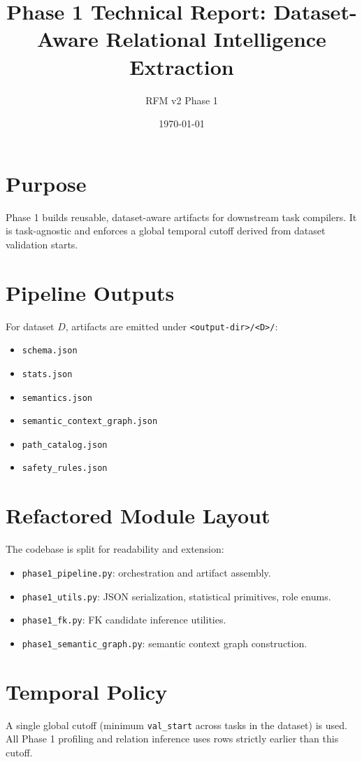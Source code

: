\documentclass[11pt]{article}
\title{Phase 1 Technical Report: Dataset-Aware Relational Intelligence Extraction}
\author{RFM v2 Phase 1}
\date{\today}
\begin{document}
\maketitle

\section{Purpose}
Phase 1 builds reusable, dataset-aware artifacts for downstream task compilers. It is task-agnostic and enforces a global temporal cutoff derived from dataset validation starts.

\section{Pipeline Outputs}
For dataset $D$, artifacts are emitted under \texttt{<output-dir>/<D>/}:
\begin{itemize}[leftmargin=1.5em]
  \item \texttt{schema.json}
  \item \texttt{stats.json}
  \item \texttt{semantics.json}
  \item \texttt{semantic\_context\_graph.json}
  \item \texttt{path\_catalog.json}
  \item \texttt{safety\_rules.json}
\end{itemize}

\section{Refactored Module Layout}
The codebase is split for readability and extension:
\begin{itemize}[leftmargin=1.5em]
  \item \texttt{phase1\_pipeline.py}: orchestration and artifact assembly.
  \item \texttt{phase1\_utils.py}: JSON serialization, statistical primitives, role enums.
  \item \texttt{phase1\_fk.py}: FK candidate inference utilities.
  \item \texttt{phase1\_semantic\_graph.py}: semantic context graph construction.
\end{itemize}

\section{Temporal Policy}
A single global cutoff (minimum \texttt{val\_start} across tasks in the dataset) is used. All Phase 1 profiling and relation inference uses rows strictly earlier than this cutoff.
\end{document}
